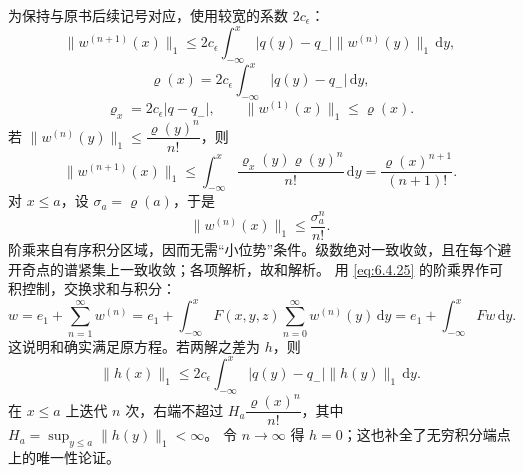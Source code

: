 \documentclass[lang=cn,scheme=chinese,mode=simple,device=normal,color=blue,
math=cm,thmcnt=section,12pt]{elegantbook}
\newcommand{\dd}{\,\mathrm{d}}
\newcommand{\eqq}[2]{\tag{#1}\label{eq:#1}#2}
\begin{document}
为保持与原书后续记号对应，使用较宽的系数 $2c_\epsilon$：
\begin{equation}\eqq{6.4.21}{\|w^{(n+1)}(x)\|_1\le2c_\epsilon\int_{-\infty}^x|q(y)-q_-|\|w^{(n)}(y)\|_1\dd y,}\end{equation}
\begin{equation}\eqq{6.4.22}{\varrho(x)=2c_\epsilon\int_{-\infty}^x|q(y)-q_-|\dd y,}\end{equation}
\begin{equation}\eqq{6.4.23}{\varrho_x=2c_\epsilon|q-q_-|,\qquad \|w^{(1)}(x)\|_1\le\varrho(x).}\end{equation}
若 $\|w^{(n)}(y)\|_1\le\dfrac{\varrho(y)^n}{n!}$，则
\begin{equation}\eqq{6.4.24}{\|w^{(n+1)}(x)\|_1
        \le\int_{-\infty}^x\dfrac{\varrho_x(y)\varrho(y)^n}{n!}\dd y
        =\dfrac{\varrho(x)^{n+1}}{(n+1)!}.}\end{equation}
对 $x\le a$，设 $\sigma_a=\varrho(a)$，于是
\begin{equation}\eqq{6.4.25}{\|w^{(n)}(x)\|_1\le\dfrac{\sigma_a^n}{n!}.}\end{equation}
阶乘来自有序积分区域，因而无需“小位势”条件。级数绝对一致收敛，且在每个避开奇点的谱紧集上一致收敛；各项解析，故和解析。
用 \eqref{eq:6.4.25} 的阶乘界作可积控制，交换求和与积分：
\begin{equation}\eqq{6.4.26}{w=e_1+\sum\limits_{n=1}^\infty w^{(n)}
        =e_1+\int_{-\infty}^xF(x,y,z)\sum\limits_{n=0}^\infty w^{(n)}(y)\dd y
        =e_1+\int_{-\infty}^xFw\dd y.}\end{equation}
这说明和确实满足原方程。若两解之差为 $h$，则
\begin{equation}\eqq{6.4.27}{\|h(x)\|_1\le2c_\epsilon\int_{-\infty}^x|q(y)-q_-|\|h(y)\|_1\dd y.}\end{equation}
在 $x\le a$ 上迭代 $n$ 次，右端不超过
$H_a\dfrac{\varrho(x)^n}{n!}$，其中 $H_a=\sup_{y\le a}\|h(y)\|_1<\infty$。
令 $n\to\infty$ 得 $h=0$；这也补全了无穷积分端点上的唯一性论证。
\end{document}
